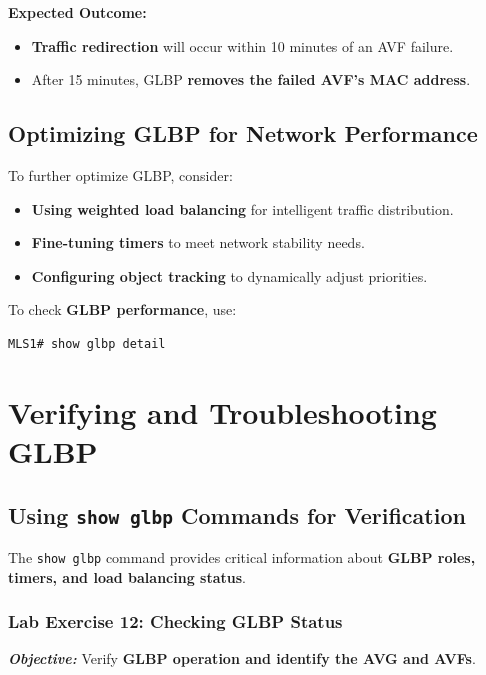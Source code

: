 \documentclass[a4paper]{book}
\begin{document}
\textbf{Expected Outcome:}
\begin{itemize}
\item \textbf{Traffic redirection} will occur within 10 minutes of an AVF failure.
\item After 15 minutes, GLBP \textbf{removes the failed AVF’s MAC address}.
\end{itemize}

\subsection{Optimizing GLBP for Network Performance}
To further optimize GLBP, consider:
\begin{itemize}
\item \checkmark \; \textbf{Using weighted load balancing} for intelligent traffic distribution.
\item \checkmark \; \textbf{Fine-tuning timers} to meet network stability needs.
\item \checkmark \; \textbf{Configuring object tracking} to dynamically adjust priorities.
\end{itemize}

To check \textbf{GLBP performance}, use:
\begin{lstlisting}
MLS1# show glbp detail
\end{lstlisting}


\vspace{1em}

\section{Verifying and Troubleshooting GLBP}

\subsection{Using \texttt{show glbp} Commands for Verification}
The \texttt{show glbp} command provides critical information about \textbf{GLBP roles, timers, 
and load balancing status}.

\subsubsection{Lab Exercise 12: Checking GLBP Status}
\textbf{\textit{Objective:}} Verify \textbf{GLBP operation and identify the AVG and AVFs}.
\vspace{1.5em}
\end{document}

